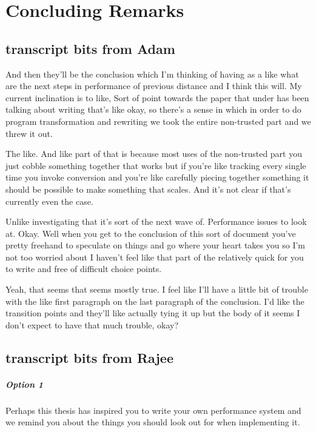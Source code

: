 \chapter{Concluding Remarks}\label{ch:conclusion}

\begin{subappendices}

    \section{transcript bits from Adam}
And then they'll be the conclusion which I'm thinking of having as a like what are the next steps in performance of previous distance and I think this will. My current inclination is to like, Sort of point towards the paper that under has been talking about writing that's like okay, so there's a sense in which in order to do program transformation and rewriting we took the entire non-trusted part and we threw it out.

The like. And like part of that is because most uses of the non-trusted part you just cobble something together that works but if you're like tracking every single time you invoke conversion and you're like carefully piecing together something it should be possible to make something that scales. And it's not clear if that's currently even the case.

Unlike investigating that it's sort of the next wave of. Performance issues to look at. Okay. Well when you get to the conclusion of this sort of document you've pretty freehand to speculate on things and go where your heart takes you so I'm not too worried about I haven't feel like that part of the relatively quick for you to write and free of difficult choice points.

Yeah, that seems that seems mostly true. I feel like I'll have a little bit of trouble with the like first paragraph on the last paragraph of the conclusion. I'd like the transition points and they'll like actually tying it up but the body of it seems I don't expect to have that much trouble, okay?


    \section{transcript bits from Rajee}

\paragraph{Option 1}
Perhaps this thesis has inspired you to write your own performance system and we remind you about the things you should look out for when implementing it.


\end{subappendices}
